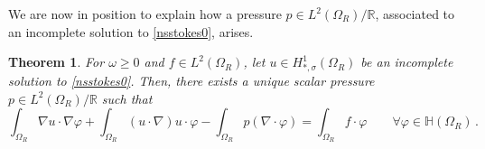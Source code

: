 \documentclass[a4paper,11pt]{article}
\newtheorem{theorem}{Theorem}[section]
\numberwithin{equation}{section}
\numberwithin{figure}{section}
\begin{document}
We are now in position to explain how a pressure $p\in L^2(\Omega_R)/\mathbb{R}$, associated to an incomplete solution to \eqref{nsstokes0}, arises.

\begin{theorem} \label{incompletepressure}
For $\omega\ge0$ and $f \in L^2(\Omega_R)$, let $u \in H^{1}_{*,\sigma}(\Omega_{R})$ be an incomplete solution to \eqref{nsstokes0}.
Then, there exists a unique scalar pressure $p \in L^{2}(\Omega_{R})/\mathbb{R}$ such that
\begin{equation} \label{nstokesdebilstarpres}
\int_{\Omega_{R}} \nabla u \cdot \nabla \varphi + \int_{\Omega_{R}} (u \cdot \nabla) u \cdot \varphi  - \int_{\Omega_{R}} p (\nabla \cdot \varphi)
= \int_{\Omega_{R}} f \cdot \varphi \qquad \forall \varphi \in \mathbb{H}(\Omega_{R}) \, .
\end{equation}
\end{theorem}
\noindent
\end{document}
